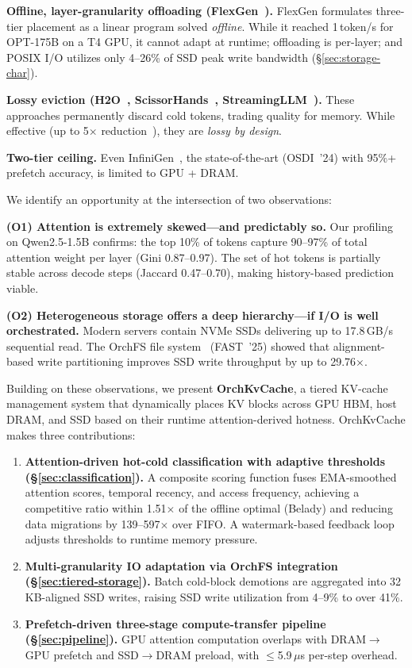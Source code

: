 \documentclass[conference]{IEEEtran}
\begin{document}
\textbf{Offline, layer-granularity offloading (FlexGen~\cite{flexgen}).} FlexGen formulates three-tier placement as a linear program solved \emph{offline}. While it reached 1\,token/s for OPT-175B on a T4 GPU, it cannot adapt at runtime; offloading is per-layer; and POSIX I/O utilizes only 4--26\% of SSD peak write bandwidth (\S\ref{sec:storage-char}).

\textbf{Lossy eviction (H2O~\cite{h2o}, ScissorHands~\cite{scissorhands}, StreamingLLM~\cite{streamingllm}).} These approaches permanently discard cold tokens, trading quality for memory. While effective (up to 5$\times$ reduction~\cite{h2o}), they are \emph{lossy by design}.

\textbf{Two-tier ceiling.} Even InfiniGen~\cite{infinigen}, the state-of-the-art (OSDI~'24) with 95\%+ prefetch accuracy, is limited to GPU + DRAM.

We identify an opportunity at the intersection of two observations:

\textbf{(O1) Attention is extremely skewed---and predictably so.} Our profiling on Qwen2.5-1.5B confirms: the top 10\% of tokens capture 90--97\% of total attention weight per layer (Gini 0.87--0.97). The set of hot tokens is partially stable across decode steps (Jaccard 0.47--0.70), making history-based prediction viable.

\textbf{(O2) Heterogeneous storage offers a deep hierarchy---if I/O is well orchestrated.} Modern servers contain NVMe SSDs delivering up to 17.8\,GB/s sequential read. The OrchFS file system~\cite{orchfs} (FAST~'25) showed that alignment-based write partitioning improves SSD write throughput by up to 29.76$\times$.

Building on these observations, we present \textbf{OrchKvCache}, a tiered KV-cache management system that dynamically places KV blocks across GPU HBM, host DRAM, and SSD based on their runtime attention-derived hotness. OrchKvCache makes three contributions:


\begin{enumerate}
\item \textbf{Attention-driven hot-cold classification with adaptive thresholds (\S\ref{sec:classification}).} A composite scoring function fuses EMA-smoothed attention scores, temporal recency, and access frequency, achieving a competitive ratio within 1.51$\times$ of the offline optimal (Belady) and reducing data migrations by 139--597$\times$ over FIFO. A watermark-based feedback loop adjusts thresholds to runtime memory pressure.

\item \textbf{Multi-granularity IO adaptation via OrchFS integration (\S\ref{sec:tiered-storage}).} Batch cold-block demotions are aggregated into 32\,KB-aligned SSD writes, raising SSD write utilization from 4--9\% to over 41\%.

\item \textbf{Prefetch-driven three-stage compute-transfer pipeline (\S\ref{sec:pipeline}).} GPU attention computation overlaps with DRAM$\to$GPU prefetch and SSD$\to$DRAM preload, with $\leq$5.9\,$\mu$s per-step overhead.
\end{enumerate}
\end{document}
